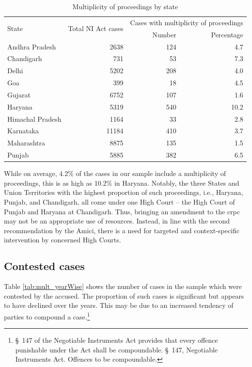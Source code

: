 \documentclass[12pt,a4paper]{article}
\begin{document}
\begin{longtable}{@{}lrrr@{}}
 \caption{Multiplicity of proceedings by state}\label{tab:state_multiplicity}\\
\toprule
 \multirow{2}{*}{State} & \multirow{2}{*}{Total NI Act cases} & \multicolumn{2}{p{4cm}}{Cases with multiplicity of proceedings} \\
 \cmidrule{3-4}
 & & Number & Percentage \\
\midrule
\endhead
Andhra Pradesh & 2638 & 124 & 4.7 \\
Chandigarh & 731 & 53 & 7.3 \\
Delhi & 5202 & 208 & 4.0 \\
Goa & 399 & 18 & 4.5 \\
Gujarat & 6752 & 107 & 1.6 \\
Haryana & 5319 & 540 & 10.2 \\
Himachal Pradesh & 1164 & 33 & 2.8 \\
Karnataka & 11184 & 410 & 3.7 \\
Maharashtra & 8875 & 135 & 1.5 \\
Punjab & 5885 & 382 & 6.5 \\
\bottomrule
\end{longtable}

While on average, 4.2\% of the cases in our sample include a multiplicity of proceedings, this is as high as 10.2\% in Haryana. Notably, the three States and Union Territories with the highest proportion of such proceedings, i.e., Haryana, Punjab, and Chandigarh, all come under one High Court -- the High Court of Punjab and Haryana at Chandigarh. Thus, bringing an amendment to the \gls{crpc} may not be an appropriate use of resources. Instead, in line with the second recommendation by the Amici, there is a need for targeted and context-specific intervention by concerned High Courts.

\subsection{Contested cases}
\label{sec:contested-cases}

Table \ref{tab:mult_yearWise} shows the number of cases in the sample which were contested by the accused. The proportion of such cases is significant but appears to have declined over the years. This may be due to an increased tendency of parties to compound a case.\footnote{\S~147 of the Negotiable Instruments Act provides that every offence punishable under the Act shall be compoundable. \S~147, Negotiable Instruments Act. Offences to be compoundable.}
\end{document}
